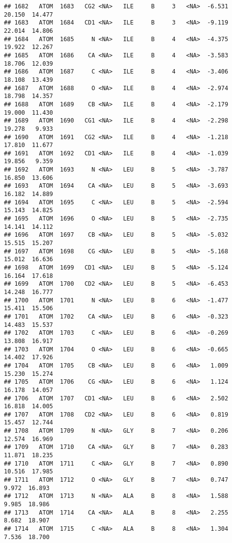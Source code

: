 \documentclass[
]{article}
\begin{document}
\begin{verbatim}
## 1682   ATOM  1683   CG2 <NA>   ILE     B     3   <NA>  -6.531  20.150  14.477
## 1683   ATOM  1684   CD1 <NA>   ILE     B     3   <NA>  -9.119  22.014  14.806
## 1684   ATOM  1685     N <NA>   ILE     B     4   <NA>  -4.375  19.922  12.267
## 1685   ATOM  1686    CA <NA>   ILE     B     4   <NA>  -3.583  18.706  12.039
## 1686   ATOM  1687     C <NA>   ILE     B     4   <NA>  -3.406  18.108  13.439
## 1687   ATOM  1688     O <NA>   ILE     B     4   <NA>  -2.974  18.798  14.357
## 1688   ATOM  1689    CB <NA>   ILE     B     4   <NA>  -2.179  19.000  11.430
## 1689   ATOM  1690   CG1 <NA>   ILE     B     4   <NA>  -2.298  19.278   9.933
## 1690   ATOM  1691   CG2 <NA>   ILE     B     4   <NA>  -1.218  17.810  11.677
## 1691   ATOM  1692   CD1 <NA>   ILE     B     4   <NA>  -1.039  19.856   9.359
## 1692   ATOM  1693     N <NA>   LEU     B     5   <NA>  -3.787  16.850  13.606
## 1693   ATOM  1694    CA <NA>   LEU     B     5   <NA>  -3.693  16.182  14.889
## 1694   ATOM  1695     C <NA>   LEU     B     5   <NA>  -2.594  15.143  14.825
## 1695   ATOM  1696     O <NA>   LEU     B     5   <NA>  -2.735  14.141  14.112
## 1696   ATOM  1697    CB <NA>   LEU     B     5   <NA>  -5.032  15.515  15.207
## 1697   ATOM  1698    CG <NA>   LEU     B     5   <NA>  -5.168  15.012  16.636
## 1698   ATOM  1699   CD1 <NA>   LEU     B     5   <NA>  -5.124  16.164  17.618
## 1699   ATOM  1700   CD2 <NA>   LEU     B     5   <NA>  -6.453  14.248  16.777
## 1700   ATOM  1701     N <NA>   LEU     B     6   <NA>  -1.477  15.411  15.506
## 1701   ATOM  1702    CA <NA>   LEU     B     6   <NA>  -0.323  14.483  15.537
## 1702   ATOM  1703     C <NA>   LEU     B     6   <NA>  -0.269  13.808  16.917
## 1703   ATOM  1704     O <NA>   LEU     B     6   <NA>  -0.665  14.402  17.926
## 1704   ATOM  1705    CB <NA>   LEU     B     6   <NA>   1.009  15.230  15.274
## 1705   ATOM  1706    CG <NA>   LEU     B     6   <NA>   1.124  16.178  14.057
## 1706   ATOM  1707   CD1 <NA>   LEU     B     6   <NA>   2.502  16.818  14.005
## 1707   ATOM  1708   CD2 <NA>   LEU     B     6   <NA>   0.819  15.457  12.744
## 1708   ATOM  1709     N <NA>   GLY     B     7   <NA>   0.206  12.574  16.969
## 1709   ATOM  1710    CA <NA>   GLY     B     7   <NA>   0.283  11.871  18.235
## 1710   ATOM  1711     C <NA>   GLY     B     7   <NA>   0.890  10.516  17.985
## 1711   ATOM  1712     O <NA>   GLY     B     7   <NA>   0.747   9.972  16.893
## 1712   ATOM  1713     N <NA>   ALA     B     8   <NA>   1.588   9.985  18.986
## 1713   ATOM  1714    CA <NA>   ALA     B     8   <NA>   2.255   8.682  18.907
## 1714   ATOM  1715     C <NA>   ALA     B     8   <NA>   1.304   7.536  18.700

\end{verbatim}
\end{document}
